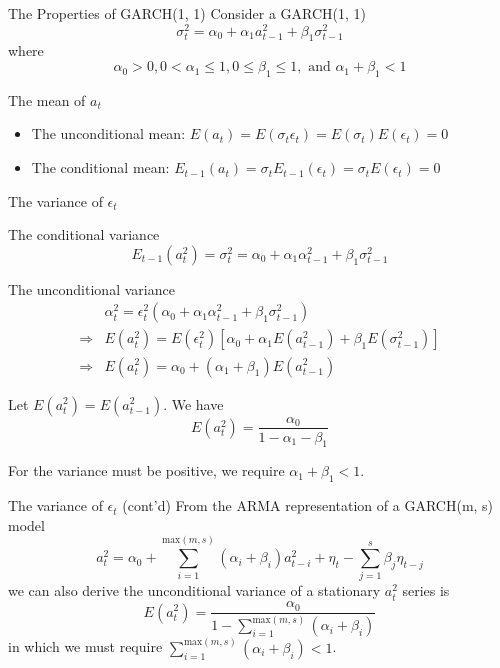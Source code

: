 \documentclass[presentation,10pt]{beamer}
\begin{document}
\begin{frame}[label={sec:orgce32aa7}]{The Properties of GARCH(1, 1)}
Consider a GARCH(1, 1)
\[ \sigma^2_t = \alpha_0 + \alpha_1 a^2_{t-1} + \beta_1 \sigma^2_{t-1} \]
where 
$$\alpha_0 > 0, 0 < \alpha_1 \leq 1, 0 \leq \beta_1 \leq 1,
\text{ and } \alpha_1 + \beta_1 < 1$$

\begin{block}{The mean of \(a_t\)}
\begin{itemize}
\item The unconditional mean: \(E(a_t) = E(\sigma_t \epsilon_t) = E(\sigma_t) E(\epsilon_t) = 0\)

\item The conditional mean: \(E_{t-1}(a_t) = \sigma_t E_{t-1}(\epsilon_t) = \sigma_t
  E(\epsilon_t) = 0\)
\end{itemize}
\end{block}
\end{frame}

\begin{frame}[label={sec:orgde6a070}]{The variance of \(\epsilon_t\)}
\begin{block}{The conditional variance}
$$E_{t-1}(a^2_t) = \sigma^2_t = \alpha_0 + \alpha_1 \alpha^2_{t-1} +
\beta_1 \sigma^2_{t-1}$$
\end{block}

\begin{block}{The unconditional variance}
\begin{align*}
& \alpha^2_t = \epsilon^2_t (\alpha_0 + \alpha_1 \alpha^2_{t-1} +
\beta_1 \sigma^2_{t-1}) \\
\Rightarrow & E(a^2_t) = E(\epsilon^2_t) \left[\alpha_0 + \alpha_1 E(a^2_{t-1}) +
\beta_1 E(\sigma^2_{t-1}) \right] \\
\Rightarrow & E(a^2_t) = \alpha_0 + (\alpha_1 + \beta_1) E(a^2_{t-1}) 
\end{align*}

Let \(E(a^2_t) = E(a^2_{t-1})\). We have
\[ E(a^2_t) = \frac{\alpha_0}{1 - \alpha_1 - \beta_1} \]

For the variance must be positive, we require \(\alpha_1 + \beta_1 <
1\). 
\end{block}
\end{frame}

\begin{frame}[label={sec:org35bb86c}]{The variance of \(\epsilon_t\) (cont'd)}
From the ARMA representation of a GARCH(m, s) model
\begin{equation*}
a^2_t = \alpha_0 + 
\sum_{i=1}^{\mathrm{max}(m,s)}(\alpha_i + \beta_i) a^2_{t-i} + \eta_t - \sum_{j=1}^s \beta_j \eta_{t-j}
\end{equation*}
we can also derive the unconditional variance of a stationary \(a_t^2\) series
is 
\begin{equation*}
E(a^2_t) = \frac{\alpha_0}{1-\sum_{i=1}^{\mathrm{max}(m,s)}(\alpha_i + \beta_i)}
\end{equation*}
in which we must require \(\sum_{i=1}^{\mathrm{max}(m,s)}(\alpha_i +
\beta_i) <1\). 
\end{frame}
\end{document}
